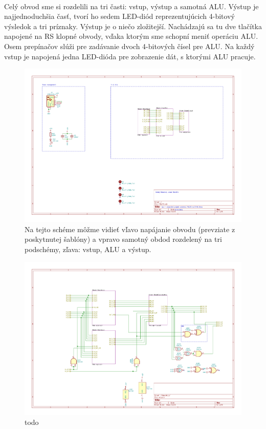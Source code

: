 \documentclass{article}
\begin{document}
    \paragraph{}
    Celý obvod sme si rozdelili na tri časti: vstup, výstup a samotná ALU. Výstup je najjednoduchšia časť, tvorí ho sedem LED-diód reprezentujúcich 4-bitový výsledok a tri príznaky. Výstup je o niečo zložitejší. Nachádzajú sa tu dve tlačítka napojené na RS klopné obvody, vďaka ktorým sme schopní meniť operáciu ALU. Osem prepínačov slúži pre zadávanie dvoch 4-bitových čísel pre ALU. Na každý vstup je napojená jedna LED-dióda pre zobrazenie dát, s ktorými ALU pracuje.

    \begin{figure}[h!]
        \centering
        \includegraphics[width=.9\linewidth]{top_sheet.pdf}
        \caption{Na tejto schéme môžme vidieť vľavo napájanie obvodu (prevziate z poskytnutej šablóny) a vpravo samotný obdod rozdelený na tri podschémy, zľava: vstup, ALU a výstup.}
    \end{figure}

    \begin{figure}[h!]
        \centering
        \includegraphics[width=.9\linewidth]{alu_sheet.pdf}
        \caption{todo}
    \end{figure}
\end{document}
